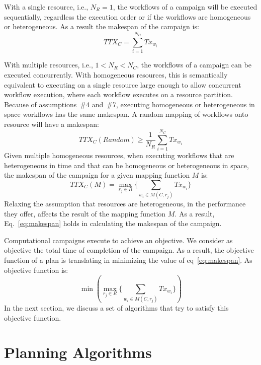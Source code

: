 With a single resource, i.e., $N_{R} = 1$, the workflows of a campaign will be executed sequentially, regardless the execution order or if the workflows are homogeneous or heterogeneous.
As a result the makespan of the campaign is:
\begin{equation}
   TTX_{C} = \sum_{i=1}^{N_{C}}Tx_{w_{i}} 
\end{equation}

With multiple resources, i.e., $1 < N_{R} < N_{C}$, the workflows of a campaign can be executed concurrently.
With homogeneous resources, this is semantically equivalent to executing on a single resource large enough to allow concurrent workflow execution, where each workflow executes on a resource partition. 
Because of assumptions~\#4 and~\#7, executing homogeneous or heterogeneous in space workflows has the same makespan.
A random mapping of workflows onto resource will have a makespan:
\begin{equation}
   TTX_{C}(Random) \geq \frac{1}{N_{R}}\sum_{i=1}^{N_{C}} Tx_{w_{i}} 
\end{equation}
Given multiple homogeneous resources, when executing workflows that are heterogeneous in time and that can be homogeneous or heterogeneous in space, the makespan of the campaign for a given mapping function $ M $ is:
\begin{equation}
TTX_{C}(M) = \max_{r_{j}\in R}\Big\{\sum_{w_{i}\in M(C,r_{j})}Tx_{w_{i}}\Big\}
\label{eq:makespan}
\end{equation}
Relaxing the assumption that resources are heterogeneous, in the performance they offer, affects the result of the mapping function $ M $.
As a result, Eq.~\ref{eq:makespan} holds in calculating the makespan of the campaign.

Computational campaigns execute to achieve an objective.
We consider as objective the total time of completion of the campaign.
As a result, the objective function of a plan is translating in minimizing the value of eq~\ref{eq:makespan}.
As objective function is:
\begin{equation}
    \min(\max_{r_{j}\in R}\Big\{\sum_{w_{i}\in M(C,r_{j})}Tx_{w_{i}}\Big\})
\end{equation}
In the next section, we discuss a set of algorithms that try to satisfy this objective function.

\section{Planning Algorithms}
\label{sec:algo}

